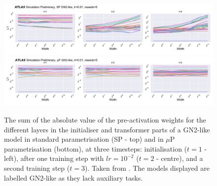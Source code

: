\begin{figure}[h!]
  \centering
  \includegraphics[width=\textwidth]{Images/FTAG/GN/HPO/spweights.png}\\
  \includegraphics[width=\textwidth]{Images/FTAG/GN/HPO/mupweights.png}
  \caption{The sum of the absolute value of the pre-activation weights for the different layers in the initialiser and transformer parts of a GN2-like model in standard parametrisation (SP - top) and in $\mu$P parametrisation (bottom), at three timesteps: initialisation ($t=1$ - left), after one training step with $lr = 10^{-2}$ ($t=2$ - centre), and a second training step ($t=3$). Taken from \cite{publicplotMUP}. The models displayed are labelled GN2-like as they lack auxiliary tasks. }
  \label{fig:muspweights}
\end{figure} 

